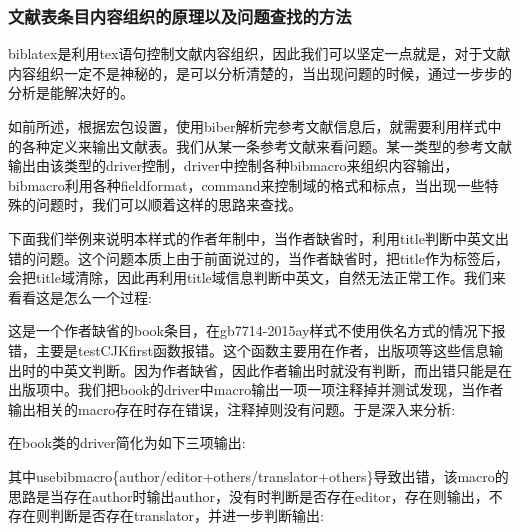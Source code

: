 \subsubsection{文献表条目内容组织的原理以及问题查找的方法}
biblatex是利用tex语句控制文献内容组织，因此我们可以坚定一点就是，对于文献内容组织一定不是神秘的，是可以分析清楚的，当出现问题的时候，通过一步步的分析是能解决好的。

如前所述，根据宏包设置，使用biber解析完参考文献信息后，就需要利用样式中的各种定义来输出文献表。我们从某一条参考文献来看问题。某一类型的参考文献输出由该类型的driver控制，driver中控制各种bibmacro来组织内容输出，bibmacro利用各种fieldformat，command来控制域的格式和标点，当出现一些特殊的问题时，我们可以顺着这样的思路来查找。

下面我们举例来说明本样式的作者年制中，当作者缺省时，利用title判断中英文出错的问题。这个问题本质上由于前面说过的，当作者缺省时，把title作为标签后，会把title域清除，因此再利用title域信息判断中英文，自然无法正常工作。我们来看看这是怎么一个过程:

这是一个作者缺省的book条目，在gb7714-2015ay样式不使用佚名方式的情况下报错，主要是testCJKfirst函数报错。这个函数主要用在作者，出版项等这些信息输出时的中英文判断。因为作者缺省，因此作者输出时就没有判断，而出错只能是在出版项中。我们把book的driver中macro输出一项一项注释掉并测试发现，当作者输出相关的macro存在时存在错误，注释掉则没有问题。于是深入来分析:

在book类的driver简化为如下三项输出:
\begin{texlist}
\end{texlist}

其中usebibmacro\{author/editor+others/translator+others\}导致出错，该macro的思路是当存在author时输出author，没有时判断是否存在editor，存在则输出，不存在则判断是否存在translator，并进一步判断输出:
\begin{texlist}
\end{texlist}

